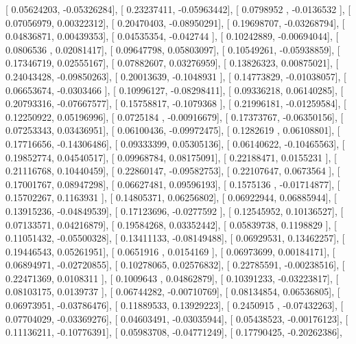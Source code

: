 \documentclass{article}
\begin{document}
       [ 0.05624203, -0.05326284],
       [ 0.23237411, -0.05963442],
       [ 0.0798952 , -0.0136532 ],
       [ 0.07056979,  0.00322312],
       [ 0.20470403, -0.08950291],
       [ 0.19698707, -0.03268794],
       [ 0.04836871,  0.00439353],
       [ 0.04535354, -0.042744  ],
       [ 0.10242889, -0.00694044],
       [ 0.0806536 ,  0.02081417],
       [ 0.09647798,  0.05803097],
       [ 0.10549261, -0.05938859],
       [ 0.17346719,  0.02555167],
       [ 0.07882607,  0.03276959],
       [ 0.13826323,  0.00875021],
       [ 0.24043428, -0.09850263],
       [ 0.20013639, -0.1048931 ],
       [ 0.14773829, -0.01038057],
       [ 0.06653674, -0.0303466 ],
       [ 0.10996127, -0.08298411],
       [ 0.09336218,  0.06140285],
       [ 0.20793316, -0.07667577],
       [ 0.15758817, -0.1079368 ],
       [ 0.21996181, -0.01259584],
       [ 0.12250922,  0.05196996],
       [ 0.0725184 , -0.00916679],
       [ 0.17373767, -0.06350156],
       [ 0.07253343,  0.03436951],
       [ 0.06100436, -0.09972475],
       [ 0.1282619 ,  0.06108801],
       [ 0.17716656, -0.14306486],
       [ 0.09333399,  0.05305136],
       [ 0.06140622, -0.10465563],
       [ 0.19852774,  0.04540517],
       [ 0.09968784,  0.08175091],
       [ 0.22188471,  0.0155231 ],
       [ 0.21116768,  0.10440459],
       [ 0.22860147, -0.09582753],
       [ 0.22107647,  0.0673564 ],
       [ 0.17001767,  0.08947298],
       [ 0.06627481,  0.09596193],
       [ 0.1575136 , -0.01714877],
       [ 0.15702267,  0.1163931 ],
       [ 0.14805371,  0.06256802],
       [ 0.06922944,  0.06885944],
       [ 0.13915236, -0.04849539],
       [ 0.17123696, -0.0277592 ],
       [ 0.12545952,  0.10136527],
       [ 0.07133571,  0.04216879],
       [ 0.19584268,  0.03352442],
       [ 0.05839738,  0.1198829 ],
       [ 0.11051432, -0.05500328],
       [ 0.13411133, -0.08149488],
       [ 0.06929531,  0.13462257],
       [ 0.19446543,  0.05261951],
       [ 0.0651916 ,  0.0154169 ],
       [ 0.06973699,  0.00184171],
       [ 0.06894971, -0.02720855],
       [ 0.10278065,  0.02576832],
       [ 0.22785591, -0.00238516],
       [ 0.22471369,  0.0108311 ],
       [ 0.1009643 ,  0.04862879],
       [ 0.10391233, -0.03223817],
       [ 0.08103175,  0.0139737 ],
       [ 0.06744282, -0.00710769],
       [ 0.08134854,  0.06536805],
       [ 0.06973951, -0.03786476],
       [ 0.11889533,  0.13929223],
       [ 0.2450915 , -0.07432263],
       [ 0.07704029, -0.03369276],
       [ 0.04603491, -0.03035944],
       [ 0.05438523, -0.00176123],
       [ 0.11136211, -0.10776391],
       [ 0.05983708, -0.04771249],
       [ 0.17790425, -0.20262386],
\end{document}
